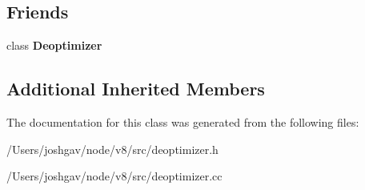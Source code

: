 \subsection*{Friends}
\begin{DoxyCompactItemize}
\item 
class {\bfseries Deoptimizer}\hypertarget{classv8_1_1internal_1_1_deoptimized_frame_info_aa89911581cd6ded032f998021aef9e5c}{}\label{classv8_1_1internal_1_1_deoptimized_frame_info_aa89911581cd6ded032f998021aef9e5c}

\end{DoxyCompactItemize}
\subsection*{Additional Inherited Members}


The documentation for this class was generated from the following files\+:\begin{DoxyCompactItemize}
\item 
/\+Users/joshgav/node/v8/src/deoptimizer.\+h\item 
/\+Users/joshgav/node/v8/src/deoptimizer.\+cc\end{DoxyCompactItemize}
